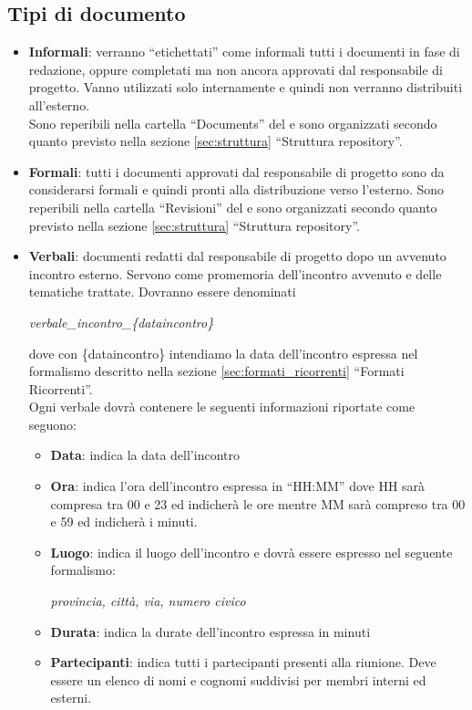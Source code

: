 \subsection{Tipi di documento}
\begin{itemize}
\item \textbf{Informali}: verranno ``etichettati'' come informali tutti i documenti in fase di redazione, oppure completati ma non ancora approvati dal responsabile di progetto. Vanno utilizzati solo internamente e quindi non verranno distribuiti all'esterno.\\
Sono reperibili nella cartella ``Documents'' del  e sono organizzati secondo quanto previsto nella sezione \ref{sec:struttura} ``Struttura repository''.
\item \textbf{Formali}: tutti i documenti approvati dal responsabile di progetto sono da considerarsi formali e quindi pronti alla distribuzione verso l'esterno. Sono reperibili nella cartella ``Revisioni'' del  e sono organizzati secondo quanto previsto nella sezione \ref{sec:struttura} ``Struttura repository''.
\item \textbf{Verbali}: documenti redatti dal responsabile di progetto dopo un avvenuto incontro esterno. Servono come promemoria dell'incontro avvenuto e delle tematiche trattate. Dovranno essere denominati
\begin{center}
\textit{verbale\_incontro\_\{dataincontro\}}
\end{center}
dove con \{dataincontro\} intendiamo la data dell'incontro espressa nel formalismo descritto nella sezione \ref{sec:formati_ricorrenti} ``Formati Ricorrenti''.\\
Ogni verbale dovrà contenere le seguenti informazioni riportate come seguono:
\begin{itemize}
\item \textbf{Data}: indica la data dell'incontro
\item \textbf{Ora}: indica l'ora dell'incontro espressa in ``HH:MM'' dove HH sarà compresa tra 00 e 23 ed indicherà le ore mentre MM sarà compreso tra 00 e 59 ed indicherà i minuti. 
\item \textbf{Luogo}: indica il luogo dell'incontro e dovrà essere espresso nel seguente formalismo:
\begin{center}
\textit{provincia, città, via, numero civico}
\end{center}
\item \textbf{Durata}: indica la durate dell'incontro espressa in minuti
\item \textbf{Partecipanti}: indica tutti i partecipanti presenti alla riunione. Deve essere un elenco di nomi e cognomi suddivisi per membri interni ed esterni.

\end{itemize}
\end{itemize}
